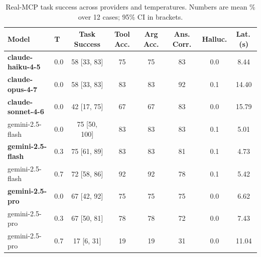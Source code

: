 \begin{table}[t]
\centering
\small
\caption{Real-MCP task success across providers and temperatures. Numbers are mean \% over 12 cases; 95\% CI in brackets.}
\label{tab:mcp_bench}
\begin{tabular}{llcccccc}
\toprule
Model & T & Task Success & Tool Acc. & Arg Acc. & Ans. Corr. & Halluc. & Lat.\,(s) \\
\midrule
\textbf{claude-haiku-4-5} & 0.0 & 58 [33, 83] & 75 & 75 & 83 & 0.0 & 8.44 \\
\textbf{claude-opus-4-7} & 0.0 & 58 [33, 83] & 83 & 83 & 92 & 0.1 & 14.40 \\
\textbf{claude-sonnet-4-6} & 0.0 & 42 [17, 75] & 67 & 67 & 83 & 0.0 & 15.79 \\
gemini-2.5-flash & 0.0 & 75 [50, 100] & 83 & 83 & 83 & 0.1 & 5.01 \\
\textbf{gemini-2.5-flash} & 0.3 & 75 [61, 89] & 83 & 83 & 81 & 0.1 & 4.73 \\
gemini-2.5-flash & 0.7 & 72 [58, 86] & 92 & 92 & 78 & 0.1 & 5.42 \\
\textbf{gemini-2.5-pro} & 0.0 & 67 [42, 92] & 75 & 75 & 75 & 0.0 & 6.62 \\
gemini-2.5-pro & 0.3 & 67 [50, 81] & 78 & 78 & 72 & 0.0 & 7.43 \\
gemini-2.5-pro & 0.7 & 17 [6, 31] & 19 & 19 & 31 & 0.0 & 11.04 \\
\bottomrule
\end{tabular}
\end{table}